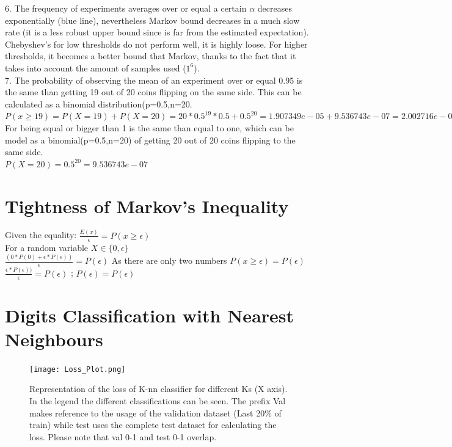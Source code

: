 \documentclass[a4paper]{article}
\begin{document}
6. The frequency of experiments averages over or equal a certain $\alpha$ decreases exponentially (blue line), nevertheless Markov bound decreases in a much slow rate (it is a less robust upper bound since is far from the estimated expectation). Chebyshev's for low thresholds do not perform well, it is highly loose. For higher thresholds, it becomes a better bound that Markov, thanks to the fact that it takes into account the amount of samples used ($1^{6}$).\\

7. The probability of observing the mean of an experiment over or equal 0.95 is the same than getting 19 out of 20 coins flipping on the same side. This can be calculated as a binomial distribution(p=0.5,n=20.\\
$ P(x \geq 19) = P(X=19) + P(X=20) = 20*0.5^{19}*0.5 + 0.5^{20}= 1.907349e-05 + 9.536743e-07 = 2.002716e-05$\\

For being equal or bigger than 1 is the same than equal to one, which can be model as a binomial(p=0.5,n=20) of getting 20 out of 20 coins flipping to the same side. \\
$ P(X=20) = 0.5^{20} = 9.536743e-07$

\section{Tightness of Markov's Inequality}
Given the equality:
$\frac{E(x)}{\epsilon} = P(x\geq\epsilon)$ \\

For a random variable $X\in\{0,\epsilon\}$ \\

$\frac{(0*P(0) + \epsilon*P(\epsilon))}{\epsilon} = P(\epsilon)$ 
As there are only two numbers $P(x\geq\epsilon) = P(\epsilon) $ \\

$\frac{\epsilon*P(\epsilon))}{\epsilon} = P(\epsilon)$ ; 
$P(\epsilon)= P(\epsilon)$

\section{Digits Classification with Nearest Neighbours}

\begin{figure}[H]
	\centering
	\texttt{[image: Loss\_Plot.png]}
	\caption{Representation of the loss of K-nn classifier for different Ks (X axis). In the legend the different classifications can be seen. The prefix Val makes reference to the usage of the validation dataset (Last 20\% of train) while test uses the complete test dataset for calculating the loss. Please note that val 0-1 and test 0-1 overlap.}
	\label{fig:plot_error}
\end{figure}
\end{document}
